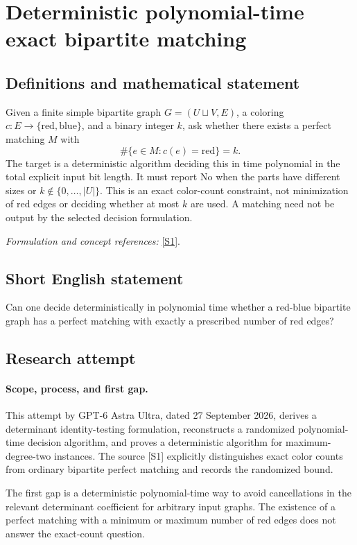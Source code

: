 \documentclass[11pt]{article}
\begin{document}
\section*{\texorpdfstring{Deterministic polynomial-time exact bipartite matching}{Deterministic polynomial-time exact bipartite matching}}\label{statement}
\subsection{Definitions and mathematical statement}
Given a finite simple bipartite graph $G=(U\sqcup V,E)$, a coloring $c:E\to\{\mathrm{red},\mathrm{blue}\}$, and a binary integer $k$, ask whether there exists a perfect matching $M$ with
\[
 \#\{e\in M:c(e)=\mathrm{red}\}=k.
\]
The target is a deterministic algorithm deciding this in time polynomial in the total explicit input bit length. It must report No when the parts have different sizes or $k\notin\{0,\ldots,|U|\}$. This is an exact color-count constraint, not minimization of red edges or deciding whether at most $k$ are used. A matching need not be output by the selected decision formulation.
\par\smallskip\textit{Formulation and concept references:} \href{https://a3nm.net/work/research/questions/}{[S1]}.

\subsection{Short English statement}
Can one decide deterministically in polynomial time whether a red-blue bipartite graph has a perfect matching with exactly a prescribed number of red edges?
\subsection{Research attempt}
\paragraph{Scope, process, and first gap.}
This attempt by GPT-6 Astra Ultra, dated 27 September 2026, derives a determinant identity-testing formulation, reconstructs a randomized polynomial-time decision algorithm, and proves a deterministic algorithm for maximum-degree-two instances. The source [S1] explicitly distinguishes exact color counts from ordinary bipartite perfect matching and records the randomized bound.

The first gap is a deterministic polynomial-time way to avoid cancellations in the relevant determinant coefficient for arbitrary input graphs. The existence of a perfect matching with a minimum or maximum number of red edges does not answer the exact-count question.
\end{document}
